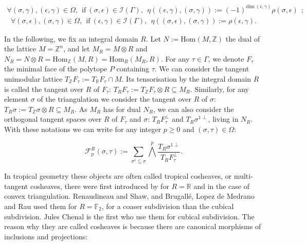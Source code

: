 \documentclass{article}
\begin{document}
\begin{align*}
    \forall (\sigma,\gamma),(\epsilon,\gamma) \in \Omega, ~~\mathrm{if}~(\sigma,\epsilon) \in\mathcal{I}(\Gamma),~~\eta((\epsilon,\gamma),(\sigma,\gamma)):= (-1)^{\mathrm{dim}~(\epsilon,\gamma)}\rho(\sigma,\epsilon)~~;
\end{align*}
\begin{align*}
    \forall (\sigma,\epsilon),(\sigma,\gamma) \in \Omega, ~~\mathrm{if}~(\epsilon,\gamma) \in\mathcal{I}(\Gamma),~~\eta((\sigma,\epsilon),(\sigma,\gamma)):= \rho(\epsilon,\gamma).
\end{align*}

In the following, we fix an integral domain $R$. Let $N:= \mathrm{Hom}(M, \mathbb{Z})$ the dual of the lattice $M=\mathbb{Z}^n$, and let $M_R = M \otimes R$ and $N_R = N \otimes R = \mathrm{Hom}_{\mathbb{Z}}(M, R) = \mathrm{Hom}_{R}(M_R,R)$. For any $\tau \in \Gamma$, we denote $F_{\tau}$ the minimal face of the polytope $P$ containing $\tau$. We can consider the tangent unimodular lattice $T_{\mathbb{Z}}F_{\tau}:=T_{\mathbb{R}}F_{\tau}\cap M$. Its tensorisation by the integral domain $R$ is called the tangent over $R$ of $F_{\tau}$: $T_{R}F_{\tau}:= T_{\mathbb{Z}}F_{\tau} \otimes R \subseteq M_R$. Similarly, for any element $\sigma$ of the triangulation we consider the tangent over $R$ of $\sigma$: $T_{R}\sigma:=T_{\mathbb{Z}}\sigma\otimes R \subseteq M_R$. As $M_R$ has for dual $N_R$, we can also consider the orthogonal tangent spaces over $R$ of $F_{\tau}$ and $\sigma$: $T_{R}F_{\tau}^{\perp}$ and $T_{R}\sigma^{1\perp}$, living in $N_R$. With these notations we can write for any integer $p \geq 0$ and $(\sigma, \tau) \in \Omega$:

\begin{equation*}
    \mathcal{F}^R_p(\sigma,\tau):= \sum_{\sigma^1 \subseteq \sigma} \bigwedge^p \frac{T_R \sigma^{1 \perp}}{T_R F_{\tau}^{\perp}}.
\end{equation*}

In tropical geometry these objects are often called tropical cosheaves, or multi-tangent cosheaves, there were first introduced by \cite{IKMZ 2018} for $R=\mathbb{R}$ and in the case of convex triangulation. Renaudineau and Shaw, and Brugallé, Lopez de Medrano and Rau used them for $R=\mathbb{F}_2$, for a coaser subdivision than the cubical subdivision. Jules Chenal is the first who use them for cubical subdivision. The reason why they are called cosheaves is because there are canonical morphisms of inclusions and projections:
\end{document}
